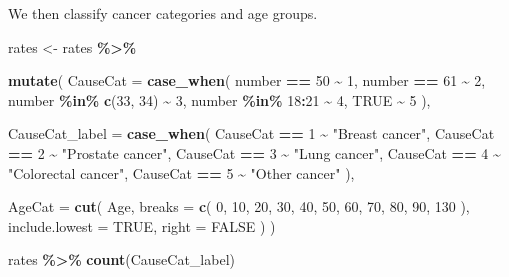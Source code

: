 \documentclass[
  11pt,
  oneside]{book}
\newenvironment{Shaded}{\begin{snugshade}}{\end{snugshade}}
\newcommand{\AttributeTok}[1]{\textcolor[rgb]{0.13,0.29,0.53}{#1}}
\newcommand{\ConstantTok}[1]{\textcolor[rgb]{0.56,0.35,0.01}{#1}}
\newcommand{\DecValTok}[1]{\textcolor[rgb]{0.00,0.00,0.81}{#1}}
\newcommand{\FunctionTok}[1]{\textcolor[rgb]{0.13,0.29,0.53}{\textbf{#1}}}
\newcommand{\NormalTok}[1]{#1}
\newcommand{\OtherTok}[1]{\textcolor[rgb]{0.56,0.35,0.01}{#1}}
\newcommand{\SpecialCharTok}[1]{\textcolor[rgb]{0.81,0.36,0.00}{\textbf{#1}}}
\newcommand{\StringTok}[1]{\textcolor[rgb]{0.31,0.60,0.02}{#1}}
\begin{document}
We then classify cancer categories and age groups.

\begin{Shaded}
\begin{Highlighting}[]
\NormalTok{rates }\OtherTok{\textless{}{-}}\NormalTok{ rates }\SpecialCharTok{\%\textgreater{}\%}
  
  \FunctionTok{mutate}\NormalTok{(}
    \AttributeTok{CauseCat =} \FunctionTok{case\_when}\NormalTok{(}
\NormalTok{      number }\SpecialCharTok{==} \DecValTok{50} \SpecialCharTok{\textasciitilde{}} \DecValTok{1}\NormalTok{,}
\NormalTok{      number }\SpecialCharTok{==} \DecValTok{61} \SpecialCharTok{\textasciitilde{}} \DecValTok{2}\NormalTok{,}
\NormalTok{      number }\SpecialCharTok{\%in\%} \FunctionTok{c}\NormalTok{(}\DecValTok{33}\NormalTok{, }\DecValTok{34}\NormalTok{) }\SpecialCharTok{\textasciitilde{}} \DecValTok{3}\NormalTok{,}
\NormalTok{      number }\SpecialCharTok{\%in\%} \DecValTok{18}\SpecialCharTok{:}\DecValTok{21} \SpecialCharTok{\textasciitilde{}} \DecValTok{4}\NormalTok{,}
      \ConstantTok{TRUE} \SpecialCharTok{\textasciitilde{}} \DecValTok{5}
\NormalTok{    ),}
    
    \AttributeTok{CauseCat\_label =} \FunctionTok{case\_when}\NormalTok{(}
\NormalTok{      CauseCat }\SpecialCharTok{==} \DecValTok{1} \SpecialCharTok{\textasciitilde{}} \StringTok{"Breast cancer"}\NormalTok{,}
\NormalTok{      CauseCat }\SpecialCharTok{==} \DecValTok{2} \SpecialCharTok{\textasciitilde{}} \StringTok{"Prostate cancer"}\NormalTok{,}
\NormalTok{      CauseCat }\SpecialCharTok{==} \DecValTok{3} \SpecialCharTok{\textasciitilde{}} \StringTok{"Lung cancer"}\NormalTok{,}
\NormalTok{      CauseCat }\SpecialCharTok{==} \DecValTok{4} \SpecialCharTok{\textasciitilde{}} \StringTok{"Colorectal cancer"}\NormalTok{,}
\NormalTok{      CauseCat }\SpecialCharTok{==} \DecValTok{5} \SpecialCharTok{\textasciitilde{}} \StringTok{"Other cancer"}
\NormalTok{    ),}
    
    \AttributeTok{AgeCat =} \FunctionTok{cut}\NormalTok{(}
\NormalTok{      Age,}
      \AttributeTok{breaks =} \FunctionTok{c}\NormalTok{(}
        \DecValTok{0}\NormalTok{, }\DecValTok{10}\NormalTok{, }\DecValTok{20}\NormalTok{, }\DecValTok{30}\NormalTok{, }\DecValTok{40}\NormalTok{,}
        \DecValTok{50}\NormalTok{, }\DecValTok{60}\NormalTok{, }\DecValTok{70}\NormalTok{, }\DecValTok{80}\NormalTok{, }\DecValTok{90}\NormalTok{, }\DecValTok{130}
\NormalTok{      ),}
      \AttributeTok{include.lowest =} \ConstantTok{TRUE}\NormalTok{,}
      \AttributeTok{right =} \ConstantTok{FALSE}
\NormalTok{    )}
\NormalTok{  )}

\NormalTok{rates }\SpecialCharTok{\%\textgreater{}\%}
  \FunctionTok{count}\NormalTok{(CauseCat\_label)}
\end{Highlighting}
\end{Shaded}
\end{document}
